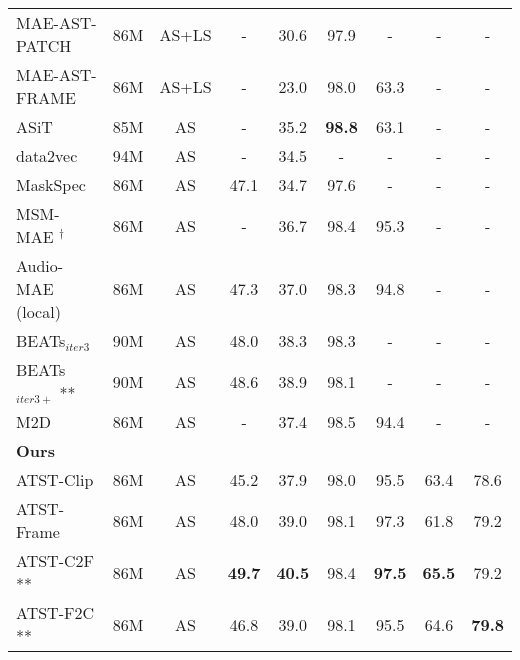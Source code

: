 \begin{table*}[ht]
{\begin{threeparttable}
\begin{tabular}{lcccccccc}
        MAE-AST-PATCH\cite{baade_mae-ast_2022}    &86M & AS+LS   & -               & 30.6 & 97.9   & -   & -  & -    \\
        MAE-AST-FRAME\cite{baade_mae-ast_2022}    &86M & AS+LS   & -               & 23.0 & 98.0   & 63.3   & -  & -   \\
        ASiT\cite{atito_asit_2022}                      &85M & AS      & -               & 35.2 & \textbf{98.8}   & 63.1  & -   & -     \\
        data2vec\cite{baevski_data2vec_2022} & 94M & AS & -&34.5&-&-&- & -\\
        MaskSpec\cite{10095691}  & 86M & AS & 47.1 & 34.7 & 97.6 & - & - & -  \\
        MSM-MAE\cite{niizumi_masked_nodate} $^{\dagger}$ & 86M & AS & - & 36.7 & 98.4 & 95.3 &  -  & - \\

        Audio-MAE (local) \cite{huang_masked_2023} &86M & AS      & 47.3            & 37.0 & 98.3   & 94.8   & - & -     \\
        BEATs$_{iter3}$ \cite{chen_beats_2022}          & 90M& AS      & 48.0            & 38.3 & 98.3   & -      & -   & -  \\        
       
                       BEATs$_{iter3+}$ \cite{chen_beats_2022} **          & 90M& AS      & 48.6            & 38.9 & 98.1  & -      & -   & -   \\
        M2D\cite{niizumi_masked_2023}                   & 86M & AS      & -               & 37.4 & 98.5   & 94.4   & -  & -  \\

        \midrule

\multicolumn{5}{l}{\textbf{Ours} } \\                              
        {ATST-Clip }              & 86M         & AS      & 45.2            & 37.9 & 98.0   & 95.5   & 63.4 & 78.6 
        \\
\vspace{1mm}
        {ATST-Frame }             &   86M       & AS      & 48.0            &39.0 & 98.1   & 97.3   & 61.8 & 79.2 \\
        
        


    
         
         {ATST-C2F} ** &86M & AS & \bf{49.7} & \bf{40.5} & 98.4& \bf{97.5} & \bf{65.5} & 79.2  \\
         
        \textcolor{mygray}{ATST-F2C **}  &\textcolor{mygray}{86M} & \textcolor{mygray}{AS} & \textcolor{mygray}{46.8} & \textcolor{mygray}{39.0} & \textcolor{mygray}{98.1}& \textcolor{mygray}{95.5} & \textcolor{mygray}{64.6} & \textcolor{mygray}{\bf{79.8}}  \\
       



\end{tabular}
\end{threeparttable}}
\end{table*}
